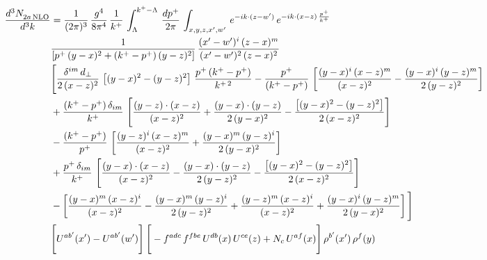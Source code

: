 \documentclass[9pt]{article}
\numberwithin{equation}{section}
\begin{document}
\begin{align}
    \frac{d^{3}N_{2a\,\rm NLO}^{\rm}}{d^{3}k}  & =  \frac{1}{(2\pi)^{3}}\,\frac{g^{4}}{8\pi^{4}}\,\frac{1}{k^{+}}\,\int_{\Lambda}^{k^{+}-\Lambda}\, \frac{dp^{+}}{2\pi}\, \int_{x,y,z,x',w'}\,e^{-ik\cdot(z-w')}\,e^{-ik\cdot (x-z)\,\frac{p^{+}}{k^{+}}}\notag \\ & \frac{1}{\left[p^{+}\,(y-x)^{2}+(k^{+}-p^{+})\,(y-z)^{2}\right]}\, \frac{(x'-w')^{i}\,(z-x)^{m}}{(x'-w')^{2}\,(z-x)^{2}} \notag \\ & \Bigg[\frac{\delta^{im}\,d_{\perp}}{2\,(x-z)^{2}}\,\left[(y-x)^{2}-(y-z)^{2}\right]\,\frac{p^{+}\,(k^{+}-p^{+})}{k^{+\,2}}-\frac{p^{+}}{(k^{+}-p^{+})}\,\left[\frac{(y-x)^{i}\,(x-z)^{m}}{(x-z)^{2}}-\frac{(y-x)^{i}\,(y-z)^{m}}{2\,(y-z)^{2}}\right]\notag \\ & +\frac{(k^{+}-p^{+})\,\delta_{im}}{k^{+}}\,\left[\frac{(y-z)\cdot (x-z)}{(x-z)^{2}}+\frac{(y-x)\cdot (y-z)}{2\,(y-x)^{2}}-\frac{\left[(y-x)^{2}-(y-z)^{2}\right]}{2\,(x-z)^{2}}\right]\notag \\ & -\frac{(k^{+}-p^{+})}{p^{+}}\,\left[\frac{(y-z)^{i}\,(x-z)^{m}}{(x-z)^{2}}+\frac{(y-x)^{m}\,(y-z)^{i}}{2\,(y-x)^{2}}\right]\notag \\ & +\frac{p^{+}\,\delta_{im}}{k^{+}}\,\left[\frac{(y-x)\cdot (x-z)}{(x-z)^{2}}-\frac{(y-x)\cdot (y-z)}{2\,(y-z)^{2}}-\frac{\left[(y-x)^{2}-(y-z)^{2}\right]}{2\,(x-z)^{2}}\right]\notag \\ &-\left[\frac{(y-x)^{m}\,(x-z)^{i}}{(x-z)^{2}}-\frac{(y-x)^{m}\,(y-z)^{i}}{2\,(y-z)^{2}}+\frac{(y-z)^{m}\,(x-z)^{i}}{(x-z)^{2}}+\frac{(y-x)^{i}\,(y-z)^{m}}{2\,(y-x)^{2}}\right]\Bigg] \notag \\ & \Bigg[U^{ab'}(x')-U^{ab'}(w')\Bigg]\,\Bigg[-f^{adc}\,f^{fbe}\,U^{db}(x)\,U^{ce}(z)+N_{c}\,U^{af}(x)\Bigg]\,\rho^{b'}(x')\,\rho^{f}(y)
\end{align}
\end{document}
